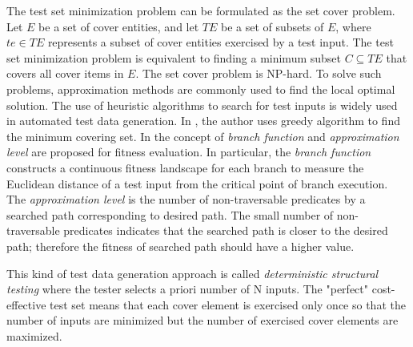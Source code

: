 \documentclass[journal]{IEEEtran}
\begin{document}
The test set minimization problem can be formulated as the set cover problem\cite{setCoverProblem,foundationOfSoftwareTesting}. Let \(E\) be a set of cover entities, and let \(TE\) be a set of subsets of \(E\), where \(te \in TE\) represents a subset of cover entities exercised by a test input. The test set minimization problem is equivalent to finding a minimum subset \(C \subseteq TE\) that covers all cover items in \(E\). The set cover problem is NP-hard\cite{setCoverProblem}. To solve such problems, approximation methods are commonly used to find the local optimal solution. The use of heuristic algorithms to search for test inputs is widely used in automated test data generation. In \cite{cmimx}, the author uses greedy algorithm to find the minimum covering set. In\cite{branchFunction,branchFunction2,branchFunction3} the concept of \emph{branch function} and \emph{approximation level} are proposed for fitness evaluation. In particular, the \emph{branch function} constructs a continuous fitness landscape for each branch to measure the Euclidean distance of a test input from the critical point of branch execution. The \emph{approximation level} is the number of non-traversable predicates by a searched path corresponding to desired path. The small number of non-traversable predicates indicates that the searched path is closer to the desired path; therefore the fitness of searched path should have a higher value.


This kind of test data generation approach is called \emph{deterministic structural testing} where the tester selects a priori number of N inputs. The "perfect" cost-effective test set means that each cover element is exercised only once so that the number of inputs are minimized but the number of exercised cover elements are maximized.
\end{document}
